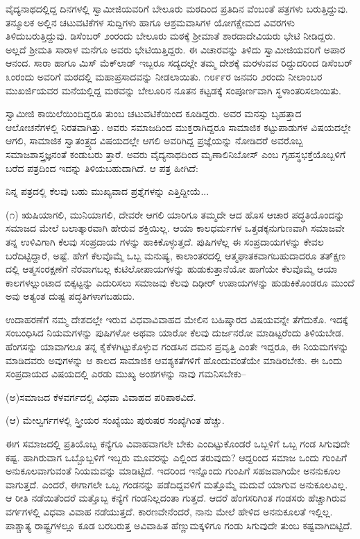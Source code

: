 ವೈದ್ಯನಾಥದಲ್ಲಿದ್ದ ದಿನಗಳಲ್ಲಿ ಸ್ವಾಮೀಜಿಯವರಿಗೆ ಬೇಲೂರು ಮಠದಿಂದ ಪ್ರತಿದಿನ ವೆಂಬಂತೆ ಪತ್ರಗಳು ಬರುತ್ತಿದ್ದುವು. ತನ್ಮೂಲಕ ಅಲ್ಲಿನ ಚಟುವಟಿಕೆಗಳ ಸುದ್ದಿಗಳು ಹಾಗೂ ಆಶ್ರಮವಾಸಿಗಳ ಯೋಗಕ್ಷೇಮದ ವಿವರಗಳು ತಿಳಿದುಬರುತ್ತಿದ್ದುವು. ಡಿಸೆಂಬರ್ ೨ಂರಂದು ಬೇಲೂರು ಮಠಕ್ಕೆ ಶ್ರೀಮಾತೆ ಶಾರದಾದೇವಿಯರು ಭೇಟಿ ನೀಡಿದ್ದರು. ಅಲ್ಲದೆ ಶ್ರೀಮತಿ ಸಾರಾಳ ಮನೆಗೂ ಅವರು ಭೇಟಿಯಿತ್ತಿದ್ದರು. ಈ ವಿಚಾರವನ್ನು ತಿಳಿದು ಸ್ವಾಮೀಜಿಯವರಿಗೆ ಅಪಾರ ಆನಂದ. ಸಾರಾ ಹಾಗೂ ಮಿಸ್ ಮೆಕ್​ಲಾಡ್ ಇಬ್ಬರೂ ಸದ್ಯದಲ್ಲೇ ತಮ್ಮ ದೇಶಕ್ಕೆ ಮರಳುವವ ರಿದ್ದುದರಿಂದ ಡಿಸೆಂಬರ್ ೩ಂರಂದು ಅವರಿಗೆ ಮಠದಲ್ಲಿ ಮಹಾಪ್ರಸಾದವನ್ನು ನೀಡಲಾಯಿತು. ೧೮೯೯ರ ಜನವರಿ ೨ರಂದು ನೀಲಾಂಬರ ಮುಖರ್ಜಿಯವರ ಮನೆಯಲ್ಲಿದ್ದ ಮಠವನ್ನು ಬೇಲೂರಿನ ನೂತನ ಕಟ್ಟಡಕ್ಕೆ ಸಂಪೂರ್ಣವಾಗಿ ಸ್ಥಳಾಂತರಿಸಲಾಯಿತು.

ಸ್ವಾಮೀಜಿ ಕಾಯಿಲೆಯಿಂದಿದ್ದರೂ ತುಂಬ ಚಟುವಟಿಕೆಯಿಂದ ಕೂಡಿದ್ದರು. ಅವರ ಮನಸ್ಸು ಬೃಹತ್ತಾದ ಆಲೋಚನೆಗಳಲ್ಲಿ ನಿರತವಾಗಿತ್ತು. ಅವರು ಸಮಾಜದಿಂದ ಮುಕ್ತರಾಗಿದ್ದರೂ ಸಾಮಾಜಿಕ ಕಟ್ಟುಪಾಡುಗಳ ವಿಷಯದಲ್ಲೇ ಆಗಲಿ, ಸಾಮಾಜಿಕ ಸ್ವಾತಂತ್ರ್ಯದ ವಿಷಯದಲ್ಲೇ ಆಗಲಿ ಅವರಿಗಿದ್ದ ಪ್ರಜ್ಞೆಯನ್ನು ನೋಡಿದರೆ ಅವರೊಬ್ಬ ಸಮಾಜಶಾಸ್ತ್ರಜ್ಞನಂತೆ ಕಂಡುಬರು ತ್ತಾರೆ. ಅವರು ವೈದ್ಯನಾಥದಿಂದ ಮೃಣಾಲಿನಿಬೋಸ್ ಎಂಬ ಗೃಹಸ್ಥಭಕ್ತೆಯೊಬ್ಬಳಿಗೆ ಬರೆದ ಪತ್ರದಿಂದ ಇದನ್ನು ತಿಳಿಯಬಹುದಾಗಿದೆ. ಆ ಪತ್ರ ಹೀಗಿದೆ:

ನಿನ್ನ ಪತ್ರದಲ್ಲಿ ಕೆಲವು ಬಹು ಮುಖ್ಯವಾದ ಪ್ರಶ್ನೆಗಳನ್ನು ಎತ್ತಿದ್ದೀಯೆ...

(೧) ಋಷಿಯಾಗಲಿ, ಮುನಿಯಾಗಲಿ, ದೇವರೇ ಆಗಲಿ ಯಾರಿಗೂ ತಮ್ಮದೇ ಆದ ಹೊಸ ಆಚಾರ ಪದ್ಧತಿಯೊಂದನ್ನು ಸಮಾಜದ ಮೇಲೆ ಬಲಾತ್ಕಾರವಾಗಿ ಹೇರುವ ಶಕ್ತಿಯಿಲ್ಲ. ಆಯಾ ಕಾಲಧರ್ಮಗಳ ಒತ್ತಡಕ್ಕನುಗುಣವಾಗಿ ಸಮಾಜವೇ ತನ್ನ ಉಳಿವಿಗಾಗಿ ಕೆಲವು ಸಂಪ್ರದಾಯ ಗಳನ್ನು ಹಾಕಿಕೊಳ್ಳುತ್ತದೆ. ಪುಷಿಗಳೆಲ್ಲ ಈ ಸಂಪ್ರದಾಯಗಳನ್ನು ಕೇವಲ ಬರೆದಿಟ್ಟಿದ್ದಾರೆ, ಅಷ್ಟೆ. ಹೇಗೆ ಕೆಲವೊಮ್ಮೆ ಒಬ್ಬ ಮನುಷ್ಯ, ಕಾಲಾಂತರದಲ್ಲಿ ಆತ್ಮಘಾತಕವಾಗಬಹುದಾದರೂ ತತ್​ಕ್ಷಣ ದಲ್ಲಿ ಆತ್ಮಸಂರಕ್ಷಣೆಗೆ ನೆರವಾಗಬಲ್ಲ ಕುಟಿಲೋಪಾಯಗಳನ್ನು ಹುಡುಕುತ್ತಾನೆಯೋ ಹಾಗೆಯೇ ಕೆಲವೊಮ್ಮೆ ಆಯಾ ಕಾಲಗಳಲ್ಲುಂಟಾದ ಬಿಕ್ಕಟ್ಟನ್ನು ಎದುರಿಸಲು ಸಮಾಜವು ಕೆಲವು ದಿಢೀರ್ ಉಪಾಯಗಳನ್ನು ಹುಡುಕಿಕೊಂಡರೂ ಮುಂದೆ ಅವು ಅತ್ಯಂತ ದುಷ್ಟ ಪದ್ಧತಿಗಳಾಗಬಹುದು.

ಉದಾಹರಣೆಗೆ ನಮ್ಮ ದೇಶದಲ್ಲೇ ಇರುವ ವಿಧವಾವಿವಾಹದ ಮೇಲಿನ ಬಹಿಷ್ಕಾರದ ವಿಷಯವನ್ನೇ ತೆಗೆದುಕೊ. ಇದಕ್ಕೆ ಸಂಬಂಧಿಸಿದ ನಿಯಮಗಳನ್ನು ಪುಷಿಗಳೋ ಅಥವಾ ಯಾರೋ ಕೆಲವು ದುರ್ಜನರೋ ಮಾಡಿಟ್ಟರೆಂದು ತಿಳಿಯಬೇಡ. ಹೆಂಗಸನ್ನು ಯಾವಾಗಲೂ ತನ್ನ ಕೈಕೆಳಗಿಟ್ಟುಕೊಳ್ಳುವ ಗಂಡಸಿನ ದಮನ ಪ್ರವೃತ್ತಿ ಎಂತೇ ಇದ್ದರೂ, ಈ ನಿಯಮಗಳನ್ನು ಮಾಡಿದವರು ಅವುಗಳನ್ನು ಆ ಕಾಲದ ಸಾಮಾಜಿಕ ಆವಶ್ಯಕತೆಗಳಿಗೆ ಹೊಂದುವಂತೆಯೇ ಮಾಡಿರಬೇಕು. ಈ ಒಂದು ಸಂಪ್ರದಾಯದ ವಿಷಯದಲ್ಲಿ ಎರಡು ಮುಖ್ಯ ಅಂಶಗಳನ್ನು ನಾವು ಗಮನಿಸಬೇಕು–

(ಅ)ಸಮಾಜದ ಕೆಳವರ್ಗದಲ್ಲಿ ವಿಧವಾ ವಿವಾಹದ ಪರಿಪಾಠವಿದೆ.

(ಆ) ಮೇಲ್ವರ್ಗಗಳಲ್ಲಿ ಸ್ತ್ರೀಯರ ಸಂಖ್ಯೆಯು ಪುರುಷರ ಸಂಖ್ಯೆಗಿಂತ ಹೆಚ್ಚು.

ಈಗ ಸಮಾಜದಲ್ಲಿ ಪ್ರತಿಯೊಬ್ಬ ಕನ್ಯೆಗೂ ವಿವಾಹವಾಗಲೇ ಬೇಕು ಎಂದಿಟ್ಟುಕೊಂಡರೆ ಒಬ್ಬಳಿಗೆ ಒಬ್ಬ ಗಂಡ ಸಿಗುವುದೇ ಕಷ್ಟ. ಹಾಗಿರುವಾಗ ಒಬ್ಬೊಬ್ಬಳಿಗೆ ಇಬ್ಬರು ಮೂವರನ್ನು ಎಲ್ಲಿಂದ ತರುವುದು? ಆದ್ದರಿಂದ ಸಮಾಜ ಒಂದು ಗುಂಪಿಗೆ ಅನುಕೂಲವಾಗುವಂತೆ ನಿಯಮವನ್ನು ಮಾಡಿಟ್ಟಿದೆ. ಇದರಿಂದ ಇನ್ನೊಂದು ಗುಂಪಿಗೆ ಸಹಜವಾಗಿಯೇ ಅನನುಕೂಲ ವಾಗುತ್ತದೆ. ಎಂದರೆ, ಈಗಾಗಲೇ ಒಬ್ಬ ಗಂಡನನ್ನು ಪಡೆದಿದ್ದವಳಿಗೆ ಮತ್ತೊಮ್ಮೆ ಮದುವೆ ಯಾಗುವ ಅನುಕೂಲವಿಲ್ಲ. ಆ ರೀತಿ ನಡೆಯಿತೆಂದರೆ ಮತ್ತೊಬ್ಬ ಕನ್ಯೆಗೆ ಗಂಡನಿಲ್ಲದಂತಾ ಗುತ್ತದೆ. ಆದರೆ ಹೆಂಗಸರಿಗಿಂತ ಗಂಡಸರು ಹೆಚ್ಚಾಗಿರುವ ವರ್ಗಗಳಲ್ಲಿ ವಿಧವಾ ವಿವಾಹ ನಡೆಯುತ್ತದೆ. ಕಾರಣವೇನೆಂದರೆ, ನಾನು ಮೇಲೆ ಹೇಳಿದ ಅನನುಕೂಲತೆ ಇಲ್ಲಿಲ್ಲ. ಪಾಶ್ಚಾತ್ಯ ರಾಷ್ಟ್ರಗಳಲ್ಲೂ ಕೂಡ ಬರಬರುತ್ತ ಅವಿವಾಹಿತ ಹೆಣ್ಣುಮಕ್ಕಳಿಗೂ ಗಂಡು ಸಿಗುವುದೇ ತುಂಬ ಕಷ್ಟವಾಗಿಬಿಟ್ಟಿದೆ.

